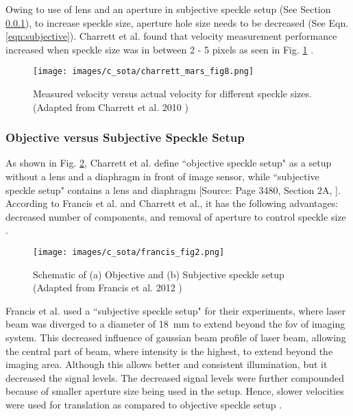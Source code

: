     \vspace{5mm}

    \noindent Owing to use of lens and an aperture in subjective speckle setup (See Section \ref{Subsubsection:Objective_Subjective}), to increase speckle size, aperture hole size needs to be decreased (See Eqn. \ref{eqn:subjective}). Charrett et al. found that velocity measurement performance increased when speckle size was in between 2 - 5 pixels as seen in Fig. \ref{fig:charrett_mars_fig8} \cite{charrett_mars}.

    \begin{figure}[ht]
        \centering
        \texttt{[image: images/c\_sota/charrett\_mars\_fig8.png]}
        \caption{Measured velocity versus actual velocity for different speckle sizes. (Adapted from Charrett et al. 2010 \cite{charrett_mars})}
        \label{fig:charrett_mars_fig8}
    \end{figure}

    \subsubsection{Objective versus Subjective Speckle Setup}\label{Subsubsection:Objective_Subjective}

    As shown in Fig. \ref{fig:francis_fig2}, Charrett et al. define ``objective speckle setup" as a setup without a lens and a diaphragm in front of image sensor, while ``subjective speckle setup" contains a lens and diaphragm [Source: Page 3480, Section 2A, \cite{francis_autonomous}]. According to Francis et al. and Charrett et al., it has the following advantages: decreased number of components, and removal of aperture to control speckle size \cite{charrett_2018, francis_autonomous}.

    \begin{figure}[ht]
        \centering
        \texttt{[image: images/c\_sota/francis\_fig2.png]}
        \caption{Schematic of (a) Objective and (b) Subjective speckle setup (Adapted from Francis et al. 2012 \cite{francis_autonomous})}
        \label{fig:francis_fig2}
    \end{figure}

    \noindent Francis et al. used a ``subjective speckle setup" for their experiments, where laser beam was diverged to a diameter of \SI{18}{\milli\meter} to extend beyond the \gls{fov} of imaging system. This decreased influence of gaussian beam profile of laser beam, allowing the central part of beam, where intensity is the highest, to extend beyond the imaging area. Although this allows better and consistent illumination, but it decreased the signal levels. The decreased signal levels were further compounded because of smaller aperture size being used in the setup. Hence, slower velocities were used for translation as compared to objective speckle setup \cite{francis_autonomous}.

